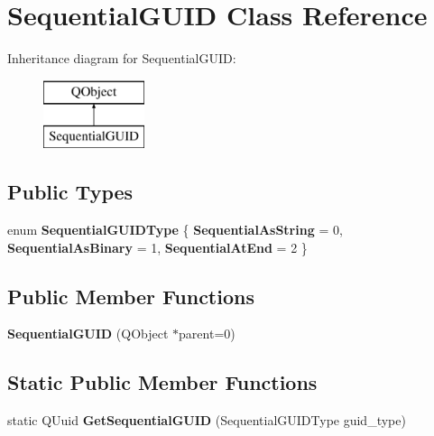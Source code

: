 \hypertarget{class_sequential_g_u_i_d}{}\section{Sequential\+G\+U\+ID Class Reference}
\label{class_sequential_g_u_i_d}
Inheritance diagram for Sequential\+G\+U\+ID\+:\begin{figure}[H]
\begin{center}
\leavevmode
\includegraphics[height=2.000000cm]{class_sequential_g_u_i_d}
\end{center}
\end{figure}
\subsection*{Public Types}
\begin{DoxyCompactItemize}
\item 
\mbox{\label{class_sequential_g_u_i_d_a085c09b21b940489a82002cc044ed6ea}} 
enum {\bfseries Sequential\+G\+U\+I\+D\+Type} \{ {\bfseries Sequential\+As\+String} = 0, 
{\bfseries Sequential\+As\+Binary} = 1, 
{\bfseries Sequential\+At\+End} = 2
 \}
\end{DoxyCompactItemize}
\subsection*{Public Member Functions}
\begin{DoxyCompactItemize}
\item 
\mbox{\label{class_sequential_g_u_i_d_a0e87930b667cd86c011099c287961421}} 
{\bfseries Sequential\+G\+U\+ID} (Q\+Object $\ast$parent=0)
\end{DoxyCompactItemize}
\subsection*{Static Public Member Functions}
\begin{DoxyCompactItemize}
\item 
\mbox{\label{class_sequential_g_u_i_d_a25eea64f60dd43c7c21539f7b47a82e2}} 
static Q\+Uuid {\bfseries Get\+Sequential\+G\+U\+ID} (Sequential\+G\+U\+I\+D\+Type guid\+\_\+type)
\end{DoxyCompactItemize}
